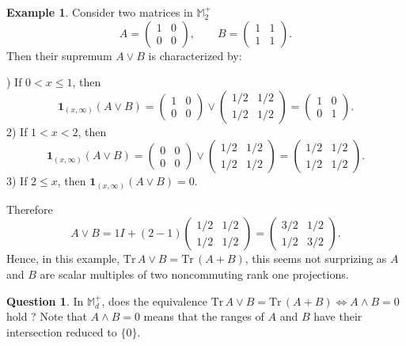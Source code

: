 \documentclass[12pt,reqno]{article}
\theoremstyle{definition}
\newtheorem{example}[theorem]{Example}
\newtheorem{question}[theorem]{Question}
\theoremstyle{remark}
\numberwithin{equation}{section}
\def\ind{\mathbf{1}}
\def\bM{\mathbb{M}}
\begin{document}
\vskip 5pt
\begin{example}\label{funny} Consider two matrices in $\bM_2^+$
$$
A=\begin{pmatrix} 1&0 \\ 0&0
\end{pmatrix},
\qquad
B=\begin{pmatrix} 1&1 \\ 1&1
\end{pmatrix}.
$$
Then their supremum $A\vee B$ is characterized by:

) If $0<x\le 1$, then
$$
\ind_{(x,\infty)}(A\vee B) = \begin{pmatrix} 1&0 \\ 0&0
\end{pmatrix}\vee \begin{pmatrix} 1/2&1/2 \\ 1/2&1/2
\end{pmatrix}=
\begin{pmatrix} 1&0 \\ 0&1
\end{pmatrix}.
$$
2) If $1<x<2$, then
$$
\ind_{(x,\infty)}(A\vee B) = \begin{pmatrix} 0&0 \\ 0&0
\end{pmatrix}\vee \begin{pmatrix} 1/2&1/2 \\ 1/2&1/2
\end{pmatrix}=
 \begin{pmatrix} 1/2&1/2 \\ 1/2&1/2
\end{pmatrix}.
$$
3) If $2\le x$, then $\ind_{(x,\infty)}(A\vee B) =0$.

Therefore
$$
A\vee B =  1I+(2-1)\begin{pmatrix} 1/2&1/2 \\ 1/2&1/2
\end{pmatrix}= \begin{pmatrix} 3/2&1/2 \\ 1/2&3/2\end{pmatrix}.
$$
Hence, in this example,
$
{\mathrm{Tr\,}} A\vee B= {\mathrm{Tr\,}} (A+B)
$,
this seems not surprizing as $A$ and $B$ are scalar multiples  of two noncommuting rank one projections.
\end{example}

\vskip 5pt
\begin{question} In $\bM_d^+$, does the equivalence
$
{\mathrm{Tr\,}} A\vee B= {\mathrm{Tr\,}} (A+B) \iff A\wedge B=0
$
hold ? Note that $A\wedge B=0$ means that  the ranges of $A$ and $B$ have their intersection reduced to $\{0\}$.
\end{question}
\end{document}
